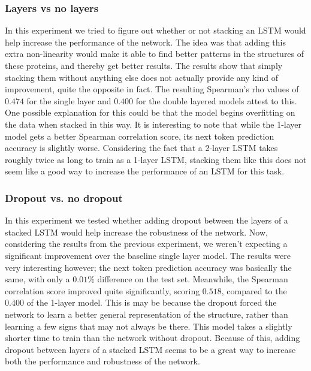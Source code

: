 \subsubsection{Layers vs no layers}
In this experiment we tried to figure out whether or not stacking an LSTM would help increase the performance of the network. The idea was that adding this extra non-linearity would make it able to find better patterns in the structures of these proteins, and thereby get better results. The results show that simply stacking them without anything else does not actually provide any kind of improvement, quite the opposite in fact. The resulting Spearman's rho values of $0.474$ for the single layer and $0.400$ for the double layered models attest to this. One possible explanation for this could be that the model begins overfitting on the data when stacked in this way. It is interesting to note that while the 1-layer model gets a better Spearman correlation score, its next token prediction accuracy is slightly worse. Considering the fact that a 2-layer LSTM takes roughly twice as long to train as a 1-layer LSTM, stacking them like this does not seem like a good way to increase the performance of an LSTM for this task.

\subsubsection{Dropout vs. no dropout}
In this experiment we tested whether adding dropout between the layers of a stacked LSTM would help increase the robustness of the network. Now, considering the results from the previous experiment, we weren't expecting a significant improvement over the baseline single layer model. The results were very interesting however; the next token prediction accuracy was basically the same, with only a $0.01\%$ difference on the test set. Meanwhile, the Spearman correlation score improved quite significantly, scoring $0.518$, compared to the $0.400$ of the 1-layer model. This is may be because the dropout forced the network to learn a better general representation of the structure, rather than learning a few signs that may not always be there. This model takes a slightly shorter time to train than the network without dropout. Because of this, adding dropout between layers of a stacked LSTM seems to be a great way to increase both the performance and robustness of the network.

